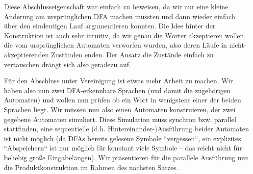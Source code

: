 \documentclass[11pt, a4paper]{article}
\theoremstyle{definition}
\theoremstyle{plain}
\numberwithin{equation}{section}
\begin{document}
Diese Abschlusseigenschaft war einfach zu beweisen, da wir nur eine kleine Änderung am ursprünglichen DFA machen mussten und dann wieder einfach über den eindeutigen Lauf argumentieren konnten. Die Idee hinter der Konstruktion ist auch sehr intuitiv, da wir genau die Wörter akzeptieren wollen, die vom ursprünglichen Automaten verworfen wurden, also deren Läufe in nicht-akzeptierenden Zuständen enden. Der Ansatz die Zustände einfach zu vertauschen drängt sich also geradezu auf.\par
Für den Abschluss unter Vereinigung ist etwas mehr Arbeit zu machen. Wir haben also nun zwei DFA-erkennbare Sprachen (und damit die zugehörigen Automaten) und wollen nun prüfen ob ein Wort in wenigstens einer der beiden Sprachen liegt. Wir müssen nun also einen Automaten konstruieren, der zwei gegebene Automaten simuliert. Diese Simulation muss synchron bzw. parallel stattfinden, eine sequentielle (d.h. Hintereinander-)Ausführung beider Automaten ist nicht möglich (da DFAs bereits gelesene Symbole ``vergessen``, ein explizites ``Abspeichern`` ist nur möglich für konstant viele Symbole -- das reicht nicht für beliebig große Eingabelängen). Wir präsentieren für die parallele Ausführung nun die Produktkonstruktion im Rahmen des nächsten Satzes.
\end{document}
